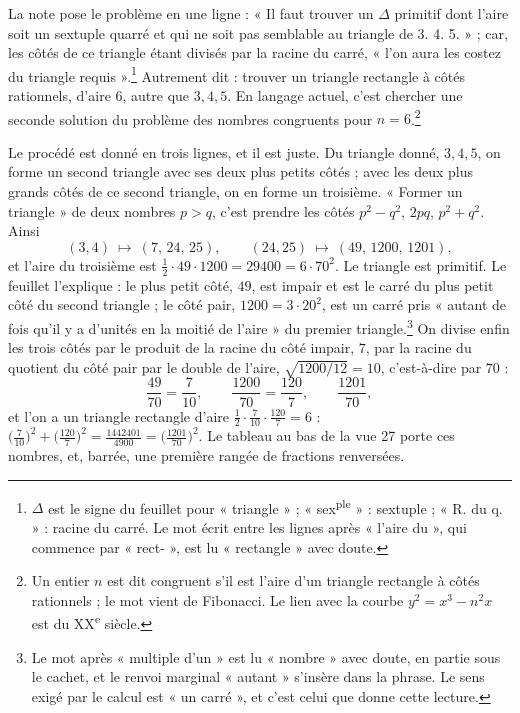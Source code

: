 \documentclass[11pt,a4paper]{article}
\begin{document}
La note pose le problème en une ligne : « Il faut trouver un \(\Delta\)
primitif dont l'aire soit un sextuple quarré et qui ne soit pas semblable au
triangle de 3. 4. 5. » ; car, les côtés de ce triangle étant divisés par la
racine du carré, « l'on aura les costez du triangle requis ».\footnote{\(\Delta\)
est le signe du feuillet pour « triangle » ; « sex\textsuperscript{ple} » :
sextuple ; « R. du q. » : racine du carré. Le mot écrit entre les lignes après
« l'aire du », qui commence par « rect- », est lu « rectangle » avec doute.}
Autrement dit : trouver un triangle rectangle à côtés rationnels, d'aire \(6\),
autre que \(3,4,5\). En langage actuel, c'est chercher une seconde solution du
problème des nombres congruents pour \(n=6\).\footnote{Un entier \(n\) est dit
congruent s'il est l'aire d'un triangle rectangle à côtés rationnels ; le mot
vient de Fibonacci. Le lien avec la courbe \(y^2=x^3-n^2x\) est du
XX\textsuperscript{e} siècle.}

Le procédé est donné en trois lignes, et il est juste. Du triangle donné,
\(3,4,5\), on forme un second triangle avec ses deux plus petits côtés ; avec
les deux plus grands côtés de ce second triangle, on en forme un troisième.
« Former un triangle » de deux nombres \(p>q\), c'est prendre les côtés
\(p^2-q^2\), \(2pq\), \(p^2+q^2\). Ainsi
\[
(3,4)\ \mapsto\ (7,\,24,\,25),\qquad (24,25)\ \mapsto\ (49,\,1200,\,1201),
\]
et l'aire du troisième est \(\tfrac12\cdot 49\cdot 1200=29400=6\cdot 70^2\).
Le triangle est primitif. Le feuillet l'explique : le plus petit côté,
\(49\), est impair et est le carré du plus petit côté du second triangle ; le
côté pair, \(1200=3\cdot 20^2\), est un carré pris « autant de fois qu'il y a
d'unités en la moitié de l'aire » du premier triangle.\footnote{Le mot après
« multiple d'un » est lu « nombre » avec doute, en partie sous le cachet, et le
renvoi marginal « autant » s'insère dans la phrase. Le sens exigé par le calcul
est « un carré », et c'est celui que donne cette lecture.} On divise enfin les
trois côtés par le produit de la racine du côté impair, \(7\), par la racine
du quotient du côté pair par le double de l'aire, \(\sqrt{1200/12}=10\),
c'est-à-dire par \(70\) :
\[
\frac{49}{70}=\frac{7}{10},\qquad \frac{1200}{70}=\frac{120}{7},\qquad
\frac{1201}{70},
\]
et l'on a un triangle rectangle d'aire \(\tfrac12\cdot\tfrac{7}{10}\cdot
\tfrac{120}{7}=6\) : \(\bigl(\tfrac{7}{10}\bigr)^2+\bigl(\tfrac{120}{7}\bigr)^2
=\tfrac{1442401}{4900}=\bigl(\tfrac{1201}{70}\bigr)^2\). Le tableau au bas de la
vue 27 porte ces nombres, et, barrée, une première rangée de fractions
renversées.
\end{document}
